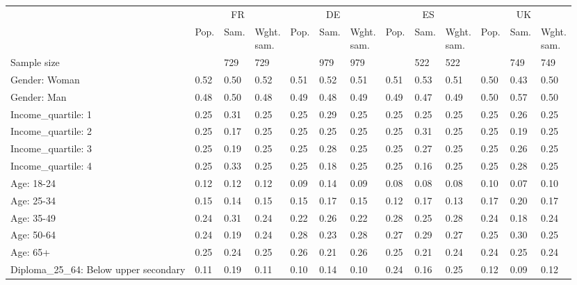 
\begin{tabular}[t]{lllllllllllll}
\toprule
\multicolumn{1}{c}{} & \multicolumn{3}{c}{FR} & \multicolumn{3}{c}{DE} & \multicolumn{3}{c}{ES} & \multicolumn{3}{c}{UK} \\
\cmidrule(l{3pt}r{3pt}){2-4} \cmidrule(l{3pt}r{3pt}){5-7} \cmidrule(l{3pt}r{3pt}){8-10} \cmidrule(l{3pt}r{3pt}){11-13}
  & Pop. & Sam. & \makecell{Wght.\\sam.} & Pop. & Sam. & \makecell{Wght.\\sam.} & Pop. & Sam. & \makecell{Wght.\\sam.} & Pop. & Sam. & \makecell{Wght.\\sam.}\\
\midrule
Sample size &  & 729 & 729 &  & 979 & 979 &  & 522 & 522 &  & 749 & 749\\
\addlinespace
Gender: Woman & 0.52 & 0.50 & 0.52 & 0.51 & 0.52 & 0.51 & 0.51 & 0.53 & 0.51 & 0.50 & 0.43 & 0.50\\
Gender: Man & 0.48 & 0.50 & 0.48 & 0.49 & 0.48 & 0.49 & 0.49 & 0.47 & 0.49 & 0.50 & 0.57 & 0.50\\
\addlinespace
Income\_quartile: 1 & 0.25 & 0.31 & 0.25 & 0.25 & 0.29 & 0.25 & 0.25 & 0.25 & 0.25 & 0.25 & 0.26 & 0.25\\
Income\_quartile: 2 & 0.25 & 0.17 & 0.25 & 0.25 & 0.25 & 0.25 & 0.25 & 0.31 & 0.25 & 0.25 & 0.19 & 0.25\\
Income\_quartile: 3 & 0.25 & 0.19 & 0.25 & 0.25 & 0.28 & 0.25 & 0.25 & 0.27 & 0.25 & 0.25 & 0.26 & 0.25\\
Income\_quartile: 4 & 0.25 & 0.33 & 0.25 & 0.25 & 0.18 & 0.25 & 0.25 & 0.16 & 0.25 & 0.25 & 0.28 & 0.25\\
\addlinespace
Age: 18-24 & 0.12 & 0.12 & 0.12 & 0.09 & 0.14 & 0.09 & 0.08 & 0.08 & 0.08 & 0.10 & 0.07 & 0.10\\
Age: 25-34 & 0.15 & 0.14 & 0.15 & 0.15 & 0.17 & 0.15 & 0.12 & 0.17 & 0.13 & 0.17 & 0.20 & 0.17\\
Age: 35-49 & 0.24 & 0.31 & 0.24 & 0.22 & 0.26 & 0.22 & 0.28 & 0.25 & 0.28 & 0.24 & 0.18 & 0.24\\
Age: 50-64 & 0.24 & 0.19 & 0.24 & 0.28 & 0.23 & 0.28 & 0.27 & 0.29 & 0.27 & 0.25 & 0.30 & 0.25\\
Age: 65+ & 0.25 & 0.24 & 0.25 & 0.26 & 0.21 & 0.26 & 0.25 & 0.21 & 0.24 & 0.24 & 0.25 & 0.24\\
\addlinespace
Diploma\_25\_64: Below upper secondary & 0.11 & 0.19 & 0.11 & 0.10 & 0.14 & 0.10 & 0.24 & 0.16 & 0.25 & 0.12 & 0.09 & 0.12\\

\end{tabular}
